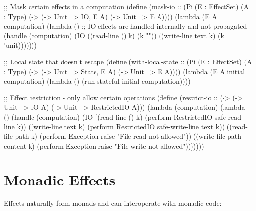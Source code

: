 \begin{example}
\begin{lambdustcode}
;; Mask certain effects in a computation
(define (mask-io :: (Pi (E : EffectSet) (A : Type)
                       (-> (-> Unit ~> {IO, E} A) (-> Unit ~> E A))))
  (lambda (E A computation)
    (lambda ()
      ;; IO effects are handled internally and not propagated
      (handle (computation)
        (IO
          ((read-line () k) (k ""))
          ((write-line text k) (k 'unit)))))))

;; Local state that doesn't escape
(define (with-local-state :: (Pi (E : EffectSet) (A : Type)  
                                 (-> (-> Unit ~> {State, E} A) (-> Unit ~> E A))))
  (lambda (E A initial computation)
    (lambda ()
      (run-stateful initial computation))))

;; Effect restriction - only allow certain operations
(define (restrict-io :: (-> (-> Unit ~> {IO} A) (-> Unit ~> {RestrictedIO} A)))
  (lambda (computation)
    (lambda ()
      (handle (computation)
        (IO
          ((read-line () k) (perform RestrictedIO safe-read-line k))
          ((write-line text k) (perform RestrictedIO safe-write-line text k))
          ((read-file path k) (perform Exception raise "File read not allowed"))
          ((write-file path content k) (perform Exception raise "File write not allowed")))))))
\end{lambdustcode}
\end{example}

\section{Monadic Effects}
\label{sec:monadic-effects}


Effects naturally form monads and can interoperate with monadic code:

